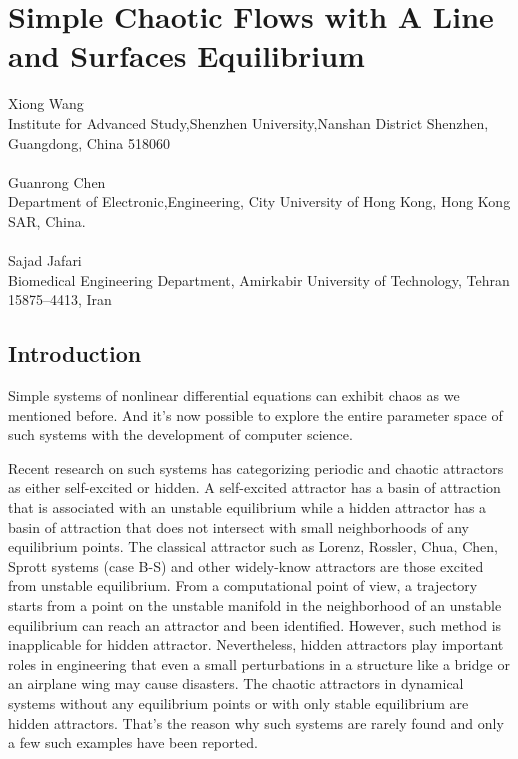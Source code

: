\chapter{Simple Chaotic Flows with A Line and Surfaces Equilibrium}
\label{chap:chaoslineequi}
\begin{pauthor}
  Xiong Wang\\
  Institute for Advanced Study,Shenzhen University,Nanshan District Shenzhen, Guangdong, China 518060\\
  \\
  Guanrong Chen\\
  Department of Electronic,Engineering, City University of Hong Kong, Hong Kong SAR, China.\\
  \\
  Sajad Jafari\\
  Biomedical Engineering Department, Amirkabir University of Technology, Tehran
  15875–4413, Iran\\
\end{pauthor}

\section{Introduction}

Simple systems of nonlinear differential equations can exhibit chaos as we mentioned before.
And it's now possible to explore the entire parameter space of such systems with the development
of computer science.

Recent research on such systems has categorizing periodic and chaotic attractors as either self-excited
or hidden\cite{Kuznetsov2010Analytical,Kuznetsov2011Hidden,Leonov2011,
  Leonov20112494,Leonov20112230,Leonov2011Hidden,Leonov2012Hidden,Leonov2013Analytical,
  Leonov2012IWCFTA2012}. 
A self-excited attractor has a basin of attraction that is associated with an unstable equilibrium while
a hidden attractor has a basin of attraction that does not intersect with small neighborhoods
of any equilibrium points.
The classical attractor such as Lorenz, Rossler, Chua, Chen, Sprott systems (case B-S) and other
widely-know attractors are those excited from unstable equilibrium. From a computational point of
view, a trajectory starts from a point on the unstable manifold in the neighborhood of an unstable
equilibrium can reach an attractor and been identified\cite{Leonov20112230}. However, such method
is inapplicable for hidden attractor. Nevertheless, hidden attractors play important roles in
engineering that even a small perturbations in a structure like a bridge or an airplane wing may cause disasters.
The chaotic attractors in dynamical systems without any equilibrium points or with only
stable equilibrium are hidden attractors. That's the reason why such systems are rarely
found and only a few such examples have been reported\cite{Jafari2013Elementary,MALIHE2013SIMPLE,Wang2011A,Wang2012Constructing,Wei2012Dynamical,Wang2012A,Wei2011Dynamical,Wang2012AB,Wei2012Delayed,Wei2010Anti}.

